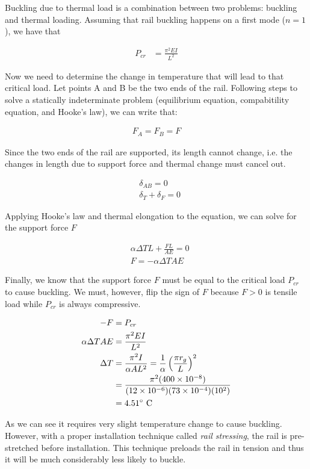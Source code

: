 \documentclass[
10pt,
a4paper,
openany,
svgnames,
]{book} %
\begin{document}
\begin{solution}

  Buckling due to thermal load is a combination between two problems: buckling and thermal loading. Assuming that rail buckling happens on a first mode ($n = 1$), we have that

  \begin{align*}
    P_{cr} &= \frac{ \pi^2 EI }{ L^2 } 
  \end{align*}

  Now we need to determine the change in temperature that will lead to that critical load. Let points A and B be the two ends of the rail. Following steps to solve a statically indeterminate problem (equilibrium equation, compabitility equation, and Hooke's law), we can write that:

  \begin{align*}
    F_A = F_B = F
  \end{align*}

  Since the two ends of the rail are supported, its length cannot change, i.e. the changes in length due to support force and thermal change must cancel out.

  \begin{align*}
    &\delta_{AB} = 0 \\
    &\delta_T + \delta_F = 0
  \end{align*}

  Applying Hooke's law and thermal elongation to the equation, we can solve for the support force $F$

  \begin{align*}
    &\alpha \Delta T L + \frac {FL}{AE} = 0 \\
    &F = -\alpha \Delta T A E
  \end{align*}

  Finally, we know that the support force $F$ must be equal to the critical load $P_{cr}$ to cause buckling. We must, however, flip the sign of $F$ because $F > 0$ is tensile load while $P_{cr}$ is always compressive.

  \begin{align*}
    -F &= P_{cr} \\
    \alpha \Delta T A E &= \frac{ \pi^2 EI }{ L^2 } \\
    \Delta T &= \frac{ \pi^2 I }{ \alpha A L^2} = \frac{1}{\alpha} \left( \frac{ \pi r_g }{L} \right)^2 \\
       &= \frac{ \pi^2 (400 \times 10^{-8}) }{ (12 \times 10^{-6})(73 \times 10^{-4})(10^2)}\\
       &= 4.51\degree \text{ C}
  \end{align*}

  As we can see it requires very slight temperature change to cause buckling. However, with a proper installation technique called \emph{rail stressing}, the rail is pre-stretched before installation. This technique preloads the rail in tension and thus it will be much considerably less likely to buckle.
\end{solution}
\end{document}
